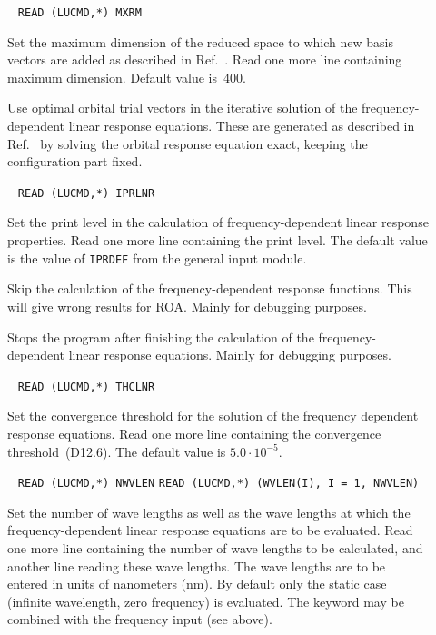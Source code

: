 \begin{description}
\item[]\verb| |\newline
\verb|READ (LUCMD,*) MXRM|

Set the maximum dimension of the reduced space to which new basis
vectors are added as described in Ref.~\cite{tuhjahjajpjjcp84}. Read
one more line containing maximum dimension. Default value is~400.

\item[] Use optimal orbital trial vectors in the
iterative solution of the frequency-depen\-dent linear
response
equations. These are generated as described in
Ref.~\cite{tuhjahjajpjjcp84} by solving the orbital response equation
exact, keeping the configuration part fixed.

\item[]\verb| |\newline
\verb|READ (LUCMD,*) IPRLNR|

Set the print level in the calculation of frequency-dependent linear
response properties. Read one more line containing the print level.
The default value is the value of \verb|IPRDEF| from the general input
module.

\item[] Skip the calculation of the frequency-dependent
response functions. This will give wrong results for ROA. Mainly for
debugging purposes.

\item[] Stops the program after finishing the
calculation of the frequency-dependent linear response equations. Mainly
for debugging purposes.

\item[]\verb| |\newline
\verb|READ (LUCMD,*) THCLNR|

Set the convergence threshold for the solution
of the frequency dependent response equations. Read one more line
containing the convergence threshold~(D12.6). The default value is
$5.0\cdot10^{-5}$.

\item[]\verb| |\newline
\verb|READ (LUCMD,*) NWVLEN|\newline
\verb|READ (LUCMD,*) (WVLEN(I), I = 1, NWVLEN)|

Set the number of wave lengths as well as the wave
lengths at which the
frequency-dependent linear response equations are to be evaluated.
Read one more line containing the number of wave lengths to be
calculated, and another line reading these wave lengths. The
wave lengths are to be entered in units of nanometers (nm).
By default only the
static case (infinite wavelength, zero frequency) is evaluated.
The  keyword may be combined with the frequency input
 (see above).
\end{description}

